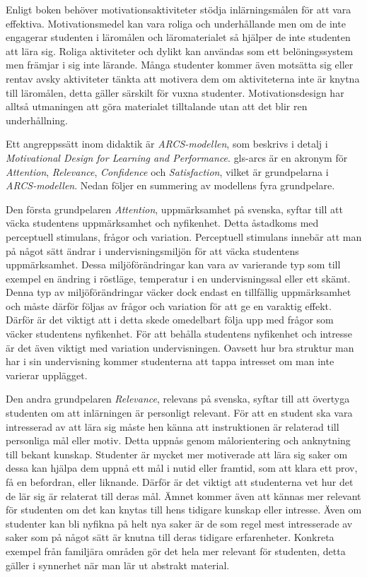 \documentclass[12pt,a4paper,twoside,openright]{article}
\begin{document}
Enligt boken behöver motivations\-aktiviteter stödja inlärningsmålen
för att vara effektiva. Motivationsmedel kan vara roliga och
underhållande men om de inte engagerar studenten i läromålen och
läromaterialet så hjälper de inte studenten att lära sig. Roliga
aktiviteter och dylikt kan användas som ett belöningssystem men
främjar i sig inte lärande. Många studenter kommer även motsätta sig
eller rentav avsky aktiviteter tänkta att motivera dem om
aktiviteterna inte är knytna till läromålen, detta gäller särskilt för
vuxna studenter.  Motivationsdesign har alltså utmaningen att göra
materialet tilltalande utan att det blir ren underhållning.

Ett angreppssätt inom didaktik är \textit{ARCS-modellen}, som beskrivs
i detalj i \textit{Motivational Design for Learning and Performance}\cite{motivational_design}.
\gls{gls-arcs} är en akronym för \textit{Attention}, \textit{Relevance},
\textit{Confidence} och \textit{Satisfaction}, vilket är grundpelarna
i \textit{ARCS-modellen}. Nedan följer en summering av
modellens fyra grundpelare.

Den första grundpelaren \textit{Attention}, uppmärksamhet på svenska,
syftar till att väcka studentens uppmärksamhet och nyfikenhet.
Detta åstadkoms med perceptuell stimulans, frågor och variation.
Perceptuell stimulans innebär att man på något sätt ändrar i
undervisningsmiljön för att väcka studentens uppmärksamhet. Dessa
miljöförändringar kan vara av varierande typ som till exempel en
ändring i röstläge, temperatur i en undervisningssal eller ett skämt.
Denna typ av miljöförändringar väcker dock endast en tillfällig
uppmärksamhet och måste därför följas av frågor och variation för att
ge en varaktig effekt. Därför är det viktigt att i detta skede
omedelbart följa upp med frågor som väcker studentens nyfikenhet. För
att behålla studentens nyfikenhet och intresse är det även viktigt med
variation undervisningen. Oavsett hur bra struktur man har i sin
undervisning kommer studenterna att tappa intresset om man inte
varierar upplägget.

Den andra grundpelaren \textit{Relevance}, relevans på svenska, syftar
till att övertyga studenten om att inlärningen är personligt relevant.
För att en student ska vara intresserad av att lära sig måste hen
känna att instruktionen är relaterad till personliga mål eller motiv.
Detta uppnås genom målorientering och anknytning till bekant kunskap.
Studenter är mycket mer motiverade att lära sig saker om dessa kan
hjälpa dem uppnå ett mål i nutid eller framtid, som att klara ett
prov, få en befordran, eller liknande. Därför är det viktigt att
studenterna vet hur det de lär sig är relaterat till deras mål. Ämnet
kommer även att kännas mer relevant för studenten om det kan knytas
till hens tidigare kunskap eller intresse. Även om studenter kan bli
nyfikna på helt nya saker är de som regel mest intresserade av saker
som på något sätt är knutna till deras tidigare erfarenheter.
Konkreta exempel från familjära områden gör det hela mer relevant för
studenten, detta gäller i synnerhet när man lär ut abstrakt material.
\end{document}
